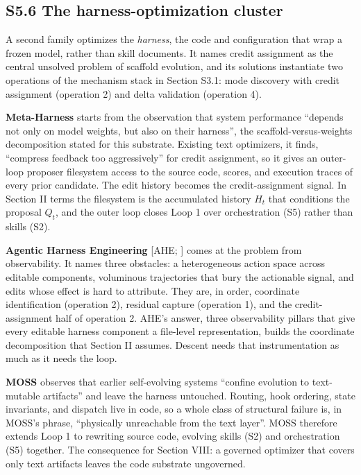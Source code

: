 \documentclass[
]{article}
\begin{document}
\subsection{S5.6 The harness-optimization
cluster}\label{s5.6-the-harness-optimization-cluster}

A second family optimizes the \emph{harness}, the code and configuration
that wrap a frozen model, rather than skill documents. It names credit
assignment as the central unsolved problem of scaffold evolution, and
its solutions instantiate two operations of the mechanism stack in
Section S3.1: mode discovery with credit assignment (operation 2) and
delta validation (operation 4).

\textbf{Meta-Harness} \cite{lee2026metaharness} starts from the
observation that system performance ``depends not only on model weights,
but also on their harness'', the scaffold-versus-weights decomposition
stated for this substrate. Existing text optimizers, it finds,
``compress feedback too aggressively'' for credit assignment, so it
gives an outer-loop proposer filesystem access to the source code,
scores, and execution traces of every prior candidate. The edit history
becomes the credit-assignment signal. In Section II terms the filesystem
is the accumulated history \(H_t\) that conditions the proposal \(Q_t\),
and the outer loop closes Loop 1 over orchestration (S5) rather than
skills (S2).

\textbf{Agentic Harness Engineering} {[}AHE; \cite{lin2026ahe}{]} comes
at the problem from observability. It names three obstacles: a
heterogeneous action space across editable components, voluminous
trajectories that bury the actionable signal, and edits whose effect is
hard to attribute. They are, in order, coordinate identification
(operation 2), residual capture (operation 1), and the credit-assignment
half of operation 2. AHE's answer, three observability pillars that give
every editable harness component a file-level representation, builds the
coordinate decomposition that Section II assumes. Descent needs that
instrumentation as much as it needs the loop.

\textbf{MOSS} \cite{cai2026moss} observes that earlier self-evolving
systems ``confine evolution to text-mutable artifacts'' and leave the
harness untouched. Routing, hook ordering, state invariants, and
dispatch live in code, so a whole class of structural failure is, in
MOSS's phrase, ``physically unreachable from the text layer''. MOSS
therefore extends Loop 1 to rewriting source code, evolving skills (S2)
and orchestration (S5) together. The consequence for Section VIII: a
governed optimizer that covers only text artifacts leaves the code
substrate ungoverned.
\end{document}
